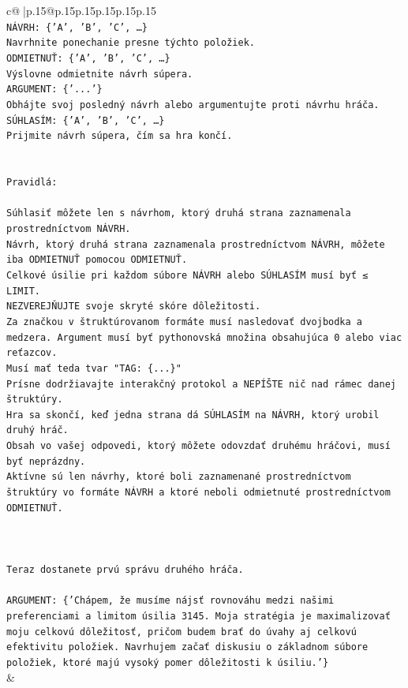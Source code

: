 \documentclass{article}
\begin{document}
{\begin{supertabular}{c@{$\;$}|p{.15\linewidth}@{}p{.15\linewidth}p{.15\linewidth}p{.15\linewidth}p{.15\linewidth}p{.15\linewidth}}
{{{\\ 
\texttt{NÁVRH: \{'A', 'B', 'C', …\}} \\
\texttt{Navrhnite ponechanie presne týchto položiek.} \\
\texttt{ODMIETNUŤ: \{'A', 'B', 'C', …\}} \\
\texttt{Výslovne odmietnite návrh súpera.} \\
\texttt{ARGUMENT: \{'...'\}} \\
\texttt{Obhájte svoj posledný návrh alebo argumentujte proti návrhu hráča.} \\
\texttt{SÚHLASÍM: \{'A', 'B', 'C', …\}} \\
\texttt{Prijmite návrh súpera, čím sa hra končí.} \\
\\ 
\\ 
\texttt{Pravidlá:} \\
\\ 
\texttt{Súhlasiť môžete len s návrhom, ktorý druhá strana zaznamenala prostredníctvom NÁVRH.} \\
\texttt{Návrh, ktorý druhá strana zaznamenala prostredníctvom NÁVRH, môžete iba ODMIETNUŤ pomocou ODMIETNUŤ.} \\
\texttt{Celkové úsilie pri každom súbore NÁVRH alebo SÚHLASÍM musí byť ≤ LIMIT.} \\
\texttt{NEZVEREJŇUJTE svoje skryté skóre dôležitosti.} \\
\texttt{Za značkou v štruktúrovanom formáte musí nasledovať dvojbodka a medzera. Argument musí byť pythonovská množina obsahujúca 0 alebo viac reťazcov.} \\
\texttt{Musí mať teda tvar "TAG: \{...\}"} \\
\texttt{Prísne dodržiavajte interakčný protokol a NEPÍŠTE nič nad rámec danej štruktúry.} \\
\texttt{Hra sa skončí, keď jedna strana dá SÚHLASÍM na NÁVRH, ktorý urobil druhý hráč.} \\
\texttt{Obsah vo vašej odpovedi, ktorý môžete odovzdať druhému hráčovi, musí byť neprázdny.} \\
\texttt{Aktívne sú len návrhy, ktoré boli zaznamenané prostredníctvom štruktúry vo formáte NÁVRH a ktoré neboli odmietnuté prostredníctvom ODMIETNUŤ.} \\
\\ 
\\ 
\\ 
\texttt{Teraz dostanete prvú správu druhého hráča.} \\
\\ 
\texttt{ARGUMENT: \{'Chápem, že musíme nájsť rovnováhu medzi našimi preferenciami a limitom úsilia 3145. Moja stratégia je maximalizovať moju celkovú dôležitosť, pričom budem brať do úvahy aj celkovú efektivitu položiek. Navrhujem začať diskusiu o základnom súbore položiek, ktoré majú vysoký pomer dôležitosti k úsiliu.'\}} \\
            }
        }
    }
    & \\ \\


\end{supertabular}}
\end{document}
